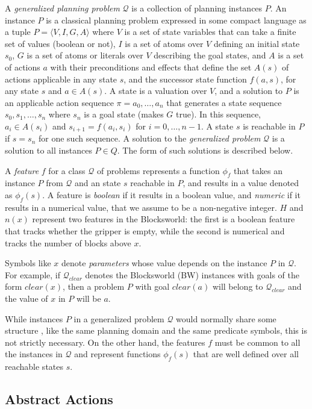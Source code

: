 \documentclass[letterpaper]{article} %
\newcommand{\tup}[1]{\langle #1 \rangle}
\newcommand{\Q}{\mathcal{Q}}
\begin{document}
A \emph{generalized planning problem} $\Q$ is a collection of planning instances $P$.
An instance $P$ is a  classical planning problem expressed in some compact language
as a tuple $P=\tup{V,I,G,A}$ where $V$ is a set of state variables that can take a
finite set of values (boolean or not), $I$ is a set of atoms over $V$ defining an
initial state $s_0$, $G$ is a set of atoms or literals over $V$ describing the goal
states, and $A$ is a set of actions $a$ with their preconditions and effects that
define the set $A(s)$ of actions applicable in any state $s$, and the successor
state function $f(a,s)$, for any state $s$ and $a \in A(s)$.
A state is a valuation over $V$, and a solution to $P$ is an applicable action
sequence $\pi=a_0,\ldots,a_n$ that generates  a state sequence $s_0,s_1,\ldots,s_{n}$
where $s_n$ is a goal state (makes $G$ true). In this sequence, $a_i \in A(s_i)$
and $s_{i+1}=f(a_i,s_i)$ for $i=0, \ldots, n-1$. A state $s$ is reachable in $P$
if $s=s_n$ for one such sequence. A solution to the \emph{generalized problem}
$\Q$ is a solution to all instances $P \in Q$. The form of such solutions is
described below.

A \emph{feature} $f$ for a class $\Q$ of problems represents a function $\phi_f$
that takes an   instance $P$ from $\Q$ and an  state $s$ reachable in $P$, and results
in a value denoted as $\phi_f(s)$. 
A feature is \emph{boolean} if it results in a boolean value, and \emph{numeric}
if it results in a numerical value, that we assume to be a non-negative integer.
$H$ and $n(x)$ represent two features in the Blocksworld:
the first is a boolean feature that tracks whether the gripper is empty, while
the second is numerical and tracks the number of blocks above $x$. 

Symbols like $x$ denote \emph{parameters} whose value depends on the
instance $P$ in $\Q$. For example, if $\Q_{clear}$ denotes the Blocksworld (BW)
instances with goals of the form $clear(x)$, then a problem 
$P$ with goal $clear(a)$ will belong to $\Q_{clear}$ and 
the value of $x$ in $P$ will be $a$.

While instances $P$ in a generalized problem $\Q$ would normally share some structure \cite{bonet:ijcai2015},
like the same planning domain and the same predicate symbols, this is not strictly  necessary.
On the other hand,  the features $f$  must be common to all the instances  in $\Q$ and 
represent functions $\phi_f(s)$ that are well defined over all reachable states $s$.


\subsection{Abstract Actions}
\end{document}
